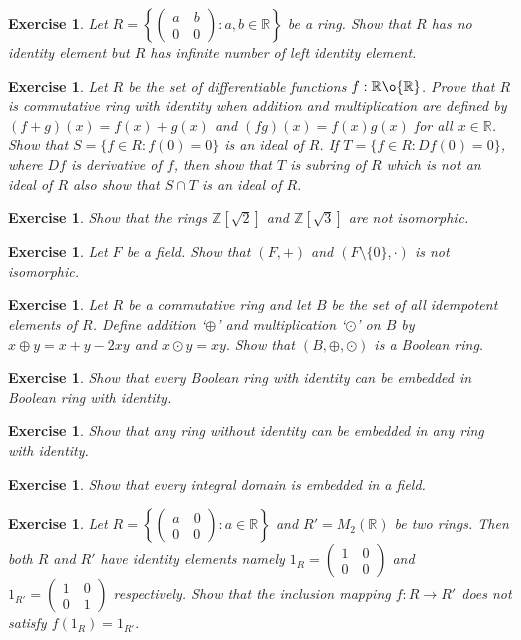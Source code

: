 \documentclass[11pt]{amsart}
\newtheorem{ex}[theorem]{Exercise}
\newcommand{\ZZ}{\mathbb Z}
\newcommand{\RR}{\mathbb R}
\begin{document}
\begin{ex}
Let $R=\left\lbrace \begin{pmatrix}
a\quad b\\
0\quad 0
\end{pmatrix}:a,b\in {\RR}\right\rbrace$ be a ring. Show that $R$ has no identity element but $R$ has infinite number of left identity element.
\end{ex}
\begin{ex}
Let $R$ be the set of differentiable functions $f:{\RR}\o {\RR}$. Prove that $R$ is commutative ring with identity when addition and multiplication are defined by $(f+g)(x)=f(x)+g(x)$ and $(fg)(x)=f(x)g(x)$ for all $x\in {\RR}$. Show that $S=\{f\in R:f(0)=0\}$ is an ideal of $R$. If $T=\{f\in R: Df(0)=0\}$, where $Df$ is derivative of $f$, then show that $T$ is subring of $R$ which is not an ideal of $R$ also show that $S\cap T$ is an ideal of $R.$
\end{ex}
\begin{ex}
Show that the rings ${\ZZ}[\sqrt{2}]$ and ${\ZZ}[\sqrt{3}]$ are not isomorphic.
\end{ex}
\begin{ex}
Let $F$ be a field. Show that $(F,+)$ and $(F\setminus \{0\},\cdot)$ is not isomorphic.
\end{ex}
\begin{ex}
Let $R$ be a commutative ring and let $B$ be the set of all idempotent elements of $R$. Define addition `$\oplus$' and multiplication `$\odot$' on $B$ by $x\oplus y=x+y-2xy$ and $x\odot y=xy.$ Show that $(B,\oplus,\odot)$ is a Boolean ring.
\end{ex}
\begin{ex}
Show that every Boolean ring with identity can be embedded in Boolean ring with identity.
\end{ex}
\begin{ex}
Show that any ring without identity can be embedded in any ring with identity.
\end{ex}
\begin{ex}
Show that every integral domain is embedded in a field.
\end{ex}
\begin{ex}
Let $R=\left\lbrace \begin{pmatrix}
a \quad 0\\
0\quad 0
\end{pmatrix}:a\in {\RR}\right\rbrace$ and $R'=M_2({\RR})$ be two rings. Then both $R$ and $R'$ have identity elements namely $1_R=\begin{pmatrix}
1 \quad 0\\
0\quad 0
\end{pmatrix}$ and $1_{R'}=\begin{pmatrix}
1 \quad 0\\
0 \quad 1
\end{pmatrix}$ respectively. Show that the inclusion mapping $f:R\to R'$ does not satisfy $f(1_R)=1_{R'}.$
\end{ex}
\end{document}
